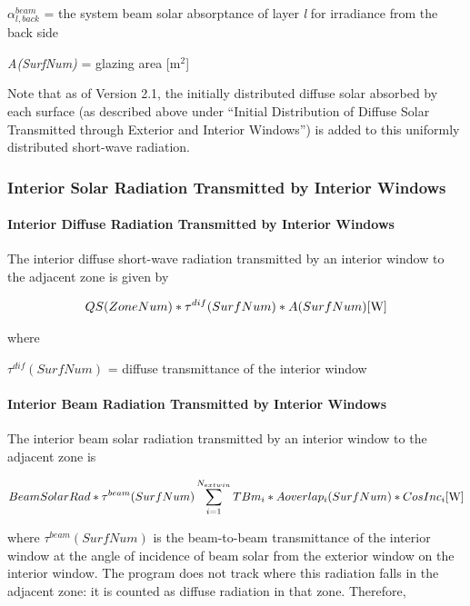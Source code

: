 \(\alpha_{l,back}^{beam}\) = the system beam solar absorptance of layer \emph{l} for irradiance from the back side

\emph{A(SurfNum)} = glazing area {[}m\(^{2}\){]}

Note that as of Version 2.1, the initially distributed diffuse solar absorbed by each surface (as described above under ``Initial Distribution of Diffuse Solar Transmitted through Exterior and Interior Windows'') is added to this uniformly distributed short-wave radiation.

\subsubsection{Interior Solar Radiation Transmitted by Interior Windows}\label{interior-solar-radiation-transmitted-by-interior-windows}

\paragraph{Interior Diffuse Radiation Transmitted by Interior Windows}\label{interior-diffuse-radiation-transmitted-by-interior-windows}

The interior diffuse short-wave radiation transmitted by an interior window to the adjacent zone is given by

\begin{equation}
QS(ZoneNum)*{\tau ^{dif}}(SurfNum)*A(SurfNum){\rm{    [W]}}
\end{equation}

where

\({\tau ^{dif}}(SurfNum)\) = diffuse transmittance of the interior window

\paragraph{Interior Beam Radiation Transmitted by Interior Windows}\label{interior-beam-radiation-transmitted-by-interior-windows}

The interior beam solar radiation transmitted by an interior window to the adjacent zone is

\begin{equation}
BeamSolarRad*{\tau ^{beam}}(SurfNum)\sum\limits_{i = 1}^{{N_{extwin}}} {TB{m_i}*Aoverla{p_i}(SurfNum)*CosIn{c_i}{\rm{    [W}}]}
\end{equation}

where \({\tau ^{beam}}(SurfNum)\) is the beam-to-beam transmittance of the interior window at the angle of incidence of beam solar from the exterior window on the interior window. The program does not track where this radiation falls in the adjacent zone: it is counted as diffuse radiation in that zone. Therefore,

